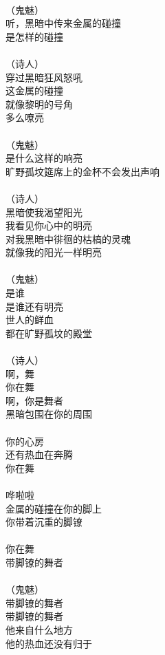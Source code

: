 \\
（鬼魅）\\
听，黑暗中传来金属的碰撞\\
是怎样的碰撞\\
\\
（诗人）\\
穿过黑暗狂风怒吼\\
这金属的碰撞\\
就像黎明的号角\\
多么嘹亮\\
\\
（鬼魅）\\
是什么这样的响亮\\
旷野孤坟筵席上的金杯不会发出声响\\
\\
（诗人）\\
黑暗使我渴望阳光\\
我看见你心中的明亮\\
对我黑暗中徘徊的枯槁的灵魂\\
就像我的阳光一样明亮\\
\\
（鬼魅）\\
是谁\\
是谁还有明亮\\
世人的鲜血\\
都在旷野孤坟的殿堂\\
\\
（诗人）\\
啊，舞\\
你在舞\\
啊，你是舞者\\
黑暗包围在你的周围\\
\\
你的心房\\
还有热血在奔腾\\
你在舞\\
\\
哗啦啦\\
金属的碰撞在你的脚上\\
你带着沉重的脚镣\\
\\
你在舞\\
带脚镣的舞者\\
\\
（鬼魅）\\
带脚镣的舞者\\
带脚镣的舞者\\
他来自什么地方\\
他的热血还没有归于\\

